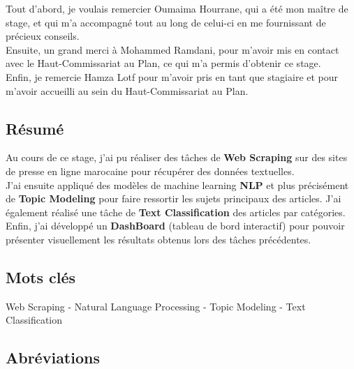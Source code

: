 \documentclass[a4paper,french,12pt]{article}
\begin{document}
Tout d'abord, je voulais remercier Oumaima Hourrane, qui a été mon maître de stage, et qui m’a accompagné tout au long de celui-ci en me fournissant de précieux conseils.\\

Ensuite, un grand merci à Mohammed Ramdani, pour m’avoir mis en contact avec le Haut-Commissariat au Plan, ce qui m’a permis d’obtenir ce stage.\\

Enfin, je remercie Hamza Lotf pour m’avoir pris en tant que stagiaire et pour m’avoir accueilli au sein du Haut-Commissariat au Plan.\\

\subsection*{Résumé}

Au cours de ce stage, j'ai pu réaliser des tâches de \textbf{Web Scraping} sur des sites de presse en ligne marocaine pour récupérer des données textuelles.\\

J'ai ensuite appliqué des modèles de machine learning \textbf{NLP} et plus précisément de \textbf{Topic Modeling} pour faire ressortir les sujets principaux des articles. J'ai également réalisé une tâche de \textbf{Text Classification} des articles par catégories.\\

Enfin, j'ai développé un \textbf{DashBoard} (tableau de bord interactif) pour pouvoir présenter visuellement les résultats obtenus lors des tâches précédentes.\\

\subsection*{Mots clés}

Web Scraping - Natural Language Processing - Topic Modeling - Text Classification\\

\subsection*{Abréviations}
\end{document}
